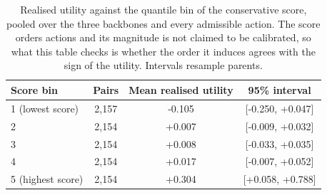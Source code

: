 \documentclass{article}
\begin{document}
\begin{table}[htbp]
  \caption{Operating points over the penalty grid, with the neighbourhood size frozen at the
  selected value on each backbone. Intervention rate is the share of requests on which a
  non-reference action ran, and conditional HIR is the share of those that raised the loss.
  Raising the penalty moves the rate and leaves the conditional rate close to where it was, so
  the largest change is in intervention frequency.}
  \label{tab:app-operating}
  \centering
  \small
  \setlength{\tabcolsep}{4pt}
\end{table}

\begin{table}[htbp]
  \caption{Realised utility against the quantile bin of the conservative score, pooled over the
  three backbones and every admissible action. The score orders actions and its magnitude is
  not claimed to be calibrated, so what this table checks is whether the order it induces
  agrees with the sign of the utility. Intervals resample parents.}
  \label{tab:app-scorebins}
  \centering
  \small
  \setlength{\tabcolsep}{4pt}
\begin{tabular}{lccc}
    \toprule
    Score bin & Pairs & Mean realised utility & 95\% interval \\
    \midrule
    1 (lowest score) & 2,157 & -0.105 & [-0.250, +0.047] \\
    2 & 2,154 & +0.007 & [-0.009, +0.032] \\
    3 & 2,154 & +0.008 & [-0.033, +0.035] \\
    4 & 2,154 & +0.017 & [-0.007, +0.052] \\
    5 (highest score) & 2,154 & +0.304 & [+0.058, +0.788] \\
    \bottomrule
  \end{tabular}
\end{table}
\end{document}
